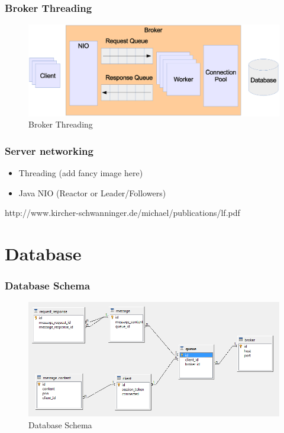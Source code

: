 \documentclass{beamer}
\begin{document}
\begin{frame}
\frametitle{Broker Threading}
\begin{figure}
  \begin{center}
    \includegraphics[scale=0.2]{../../drawings/broker-threading.eps}
  \end{center}
  \caption{Broker Threading}
  \label{fig:broker-threading}
\end{figure}


\end{frame}


\begin{frame}
\frametitle{Server networking}
\begin{itemize}
\item Threading (add fancy image here)
\item Java NIO (Reactor or Leader/Followers)
\end{itemize}
http://www.kircher-schwanninger.de/michael/publications/lf.pdf
\end{frame}



\section{Database}
\begin{frame}
\frametitle{Database Schema}

\begin{figure}
  \begin{center}
    \includegraphics[scale=1.0]{../../database/db-schema.png}
  \end{center}
  \caption{Database Schema}
  \label{fig:db-schema}
\end{figure}
\end{frame}
\end{document}
